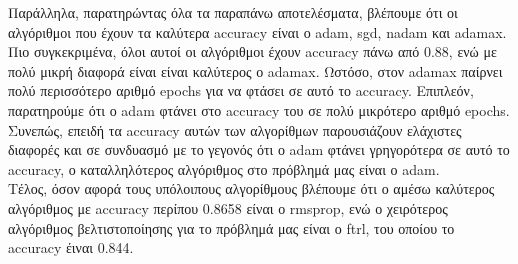 \documentclass{article}
\begin{document}
	\noindent
	Παράλληλα, παρατηρώντας όλα τα παραπάνω αποτελέσματα, βλέπουμε ότι οι αλγόριθμοι που έχουν τα καλύτερα accuracy είναι ο adam, sgd, nadam και adamax. Πιο συγκεκριμένα, όλοι αυτοί οι αλγόριθμοι έχουν accuracy πάνω από 0.88, ενώ με πολύ μικρή διαφορά είναι είναι καλύτερος ο adamax. Ωστόσο, στον adamax παίρνει πολύ περισσότερο αριθμό epochs για να φτάσει σε αυτό το accuracy. Eπιπλεόν, παρατηρούμε ότι ο adam φτάνει στο accuracy του σε πολύ μικρότερο αριθμό epochs. Συνεπώς, επειδή τα accuracy αυτών των αλγορίθμων παρουσιάζουν ελάχιστες διαφορές και σε συνδυασμό με το γεγονός ότι ο adam φτάνει γρηγορότερα σε αυτό το accuracy, ο καταλληλότερος αλγόριθμος στο πρόβλημά μας είναι ο adam. \\
	
	\noindent
	Τέλος, όσον αφορά τους υπόλοιπους αλγορίθμους βλέπουμε ότι ο αμέσω καλύτερος αλγόριθμος με accuracy περίπου 0.8658 είναι ο rmsprop, ενώ ο χειρότερος αλγόριθμος βελτιστοποίησης για το πρόβλημά μας είναι ο ftrl, του οποίου το accuracy έιναι 0.844.\\
\end{document}
